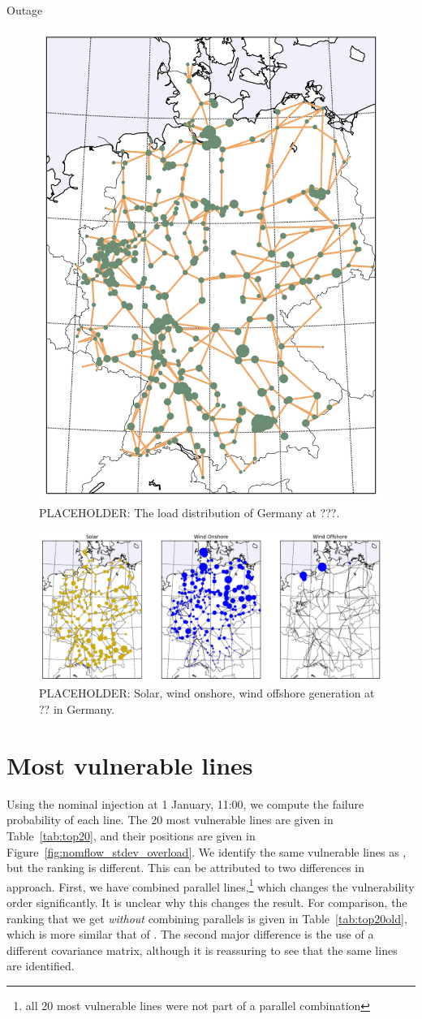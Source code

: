 \documentclass[main.tex]{subfiles}
\begin{document}
Outage


\begin{figure}
    \centering
    \includegraphics[width=.4\textwidth]{img/load.png}
    \caption{PLACEHOLDER: The load distribution of Germany at ???.}
    \label{fig:loaddistribution}
\end{figure}

\begin{figure}
    \centering
    \includegraphics[width=\textwidth]{img/solarwind.png}
    \caption{PLACEHOLDER: Solar, wind onshore, wind offshore generation at ?? in Germany.}
    \label{fig:solarwind}
\end{figure}


\section{Most vulnerable lines}
Using the nominal injection at 1 January, 11:00, we compute the failure probability of each line. The 20 most vulnerable lines are given in Table~\ref{tab:top20}, and their positions are given in Figure~\ref{fig:nomflow_stdev_overload}. We identify the same vulnerable lines as \cite{Nesti2018supplemental}, but the ranking is different. This can be attributed to two differences in approach. First, we have combined parallel lines,\footnote{all 20 most vulnerable lines were not part of a parallel combination} which changes the vulnerability order significantly. It is unclear why this changes the result. For comparison, the ranking that we get \emph{without} combining parallels is given in Table~\ref{tab:top20old}, which is more similar that of \cite{Nesti2018supplemental}. The second major difference is the use of a different covariance matrix, although it is reassuring to see that the same lines are identified.
\end{document}
